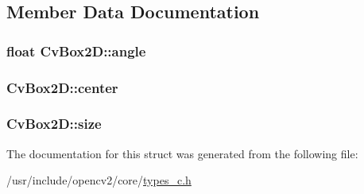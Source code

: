 \subsection{Member Data Documentation}
\hypertarget{structCvBox2D_a18fa38be22dc16224a21958caf99926a}{
\subsubsection[{angle}]{\setlength{\rightskip}{0pt plus 5cm}float Cv\-Box2\-D\-::angle}}\label{structCvBox2D_a18fa38be22dc16224a21958caf99926a}
\hypertarget{structCvBox2D_aa643ec82a301850a958b77ff80951da2}{
\subsubsection[{center}]{ Cv\-Box2\-D\-::center}}\label{structCvBox2D_aa643ec82a301850a958b77ff80951da2}
\hypertarget{structCvBox2D_adf96a3b9aaede51ab36ea74eca252d51}{
\subsubsection[{size}]{ Cv\-Box2\-D\-::size}}\label{structCvBox2D_adf96a3b9aaede51ab36ea74eca252d51}


The documentation for this struct was generated from the following file\-:\begin{DoxyCompactItemize}
\item 
/usr/include/opencv2/core/\hyperlink{core_2types__c_8h}{types\-\_\-c.\-h}\end{DoxyCompactItemize}
